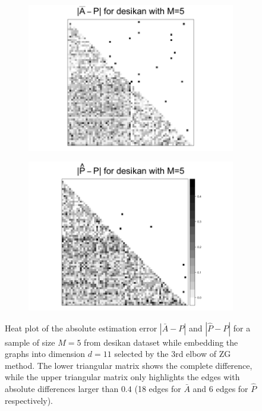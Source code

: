 \documentclass[a4paper]{article}
\begin{document}
\begin{figure}
\centering
\begin{subfigure}{.5\textwidth}
  \centering
  \includegraphics[width=1.2\linewidth]{Diff2_desikan_m5.png}
\end{subfigure}%
\begin{subfigure}{.5\textwidth}
  \centering
  \includegraphics[width=1.2\linewidth]{Diff3_desikan_m5.png}
\end{subfigure}
\caption{Heat plot of the absolute estimation error $|\bar{A} - P|$ and $|\hat{P} - P|$ for a sample of size $M=5$ from desikan dataset while embedding the graphs into dimension $d=11$ selected by the 3rd elbow of ZG method. The lower triangular matrix shows the complete difference, while the upper triangular matrix only highlights the edges with absolute differences larger than $0.4$ (18 edges for $\bar{A}$ and 6 edges for $\hat{P}$ respectively).}
\label{fig:Diff_desikan_m5}
\end{figure}
\end{document}
